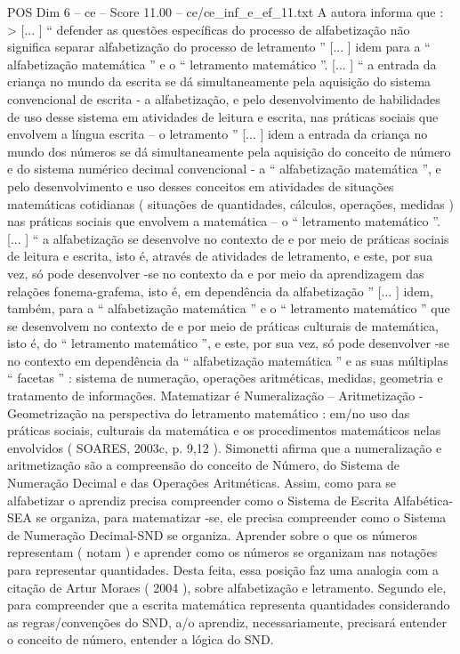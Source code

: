 \begin{textsample}{POS Dim 6 – ce – Score 11.00 – ce/ce\_inf\_e\_ef\_11.txt}
A autora informa que : > [... ] “ defender as questões específicas do processo de alfabetização não significa separar alfabetização do processo de letramento ” [... ] idem para a “ alfabetização matemática ” e o “ letramento matemático ”. [... ] “ a entrada da criança no mundo da escrita se dá simultaneamente pela aquisição do sistema convencional de escrita - a alfabetização, e pelo desenvolvimento de habilidades de uso desse sistema em atividades de leitura e escrita, nas práticas sociais que envolvem a língua escrita – o letramento ” [... ] idem a entrada da criança no mundo dos números se dá simultaneamente pela aquisição do conceito de número e do sistema numérico decimal convencional - a “ alfabetização matemática ”, e pelo desenvolvimento e uso desses conceitos em atividades de situações matemáticas cotidianas ( situações de quantidades, cálculos, operações, medidas ) nas práticas sociais que envolvem a matemática – o “ letramento matemático ”. [... ] “ a alfabetização se desenvolve no contexto de e por meio de práticas sociais de leitura e escrita, isto é, através de atividades de letramento, e este, por sua vez, só pode desenvolver -se no contexto da e por meio da aprendizagem das relações fonema-grafema, isto é, em dependência da alfabetização ” [... ] idem, também, para a “ alfabetização matemática ” e o “ letramento matemático ” que se desenvolvem no contexto de e por meio de práticas culturais de matemática, isto é, do “ letramento matemático ”, e este, por sua vez, só pode desenvolver -se no contexto em dependência da “ alfabetização matemática ” e as suas múltiplas “ facetas ” : sistema de numeração, operações aritméticas, medidas, geometria e tratamento de informações.
Matematizar é Numeralização – Aritmetização - Geometrização na perspectiva do letramento matemático : em/no uso das práticas sociais, culturais da matemática e os procedimentos matemáticos nelas envolvidos ( SOARES, 2003c, p. 9,12 ).
Simonetti afirma que a numeralização e aritmetização são a compreensão do conceito de Número, do Sistema de Numeração Decimal e das Operações Aritméticas.
Assim, como para se alfabetizar o aprendiz precisa compreender como o Sistema de Escrita Alfabética-SEA se organiza, para matematizar -se, ele precisa compreender como o Sistema de Numeração Decimal-SND se organiza.
Aprender sobre o que os números representam ( notam ) e aprender como os números se organizam nas notações para representar quantidades.
Desta feita, essa posição faz uma analogia com a citação de Artur Moraes ( 2004 ), sobre alfabetização e letramento.
Segundo ele, para compreender que a escrita matemática representa quantidades considerando as regras/convenções do SND, a/o aprendiz, necessariamente, precisará entender o conceito de número, entender a lógica do SND.

\end{textsample}

